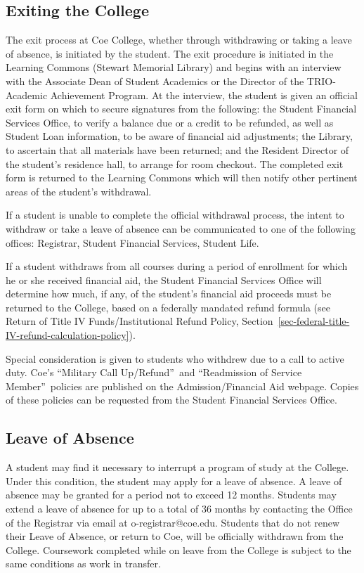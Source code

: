 \documentclass[
  letterpaper,
]{scrbook}
\begin{document}
\subsection{Exiting the College}\label{exiting-the-college}

The exit process at Coe College, whether through withdrawing or taking a
leave of absence, is initiated by the student. The exit procedure is
initiated in the Learning Commons (Stewart Memorial Library) and begins
with an interview with the Associate Dean of Student Academics or the
Director of the TRIO-Academic Achievement Program. At the interview, the
student is given an official exit form on which to secure signatures
from the following: the Student Financial Services Office, to verify a
balance due or a credit to be refunded, as well as Student Loan
information, to be aware of financial aid adjustments; the Library, to
ascertain that all materials have been returned; and the Resident
Director of the student's residence hall, to arrange for room checkout.
The completed exit form is returned to the Learning Commons which will
then notify other pertinent areas of the student's withdrawal.

If a student is unable to complete the official withdrawal process, the
intent to withdraw or take a leave of absence can be communicated to one
of the following offices: Registrar, Student Financial Services, Student
Life.

If a student withdraws from all courses during a period of enrollment
for which he or she received financial aid, the Student Financial
Services Office will determine how much, if any, of the student's
financial aid proceeds must be returned to the College, based on a
federally mandated refund formula (see Return of Title IV
Funds/Institutional Refund Policy,
Section~\ref{sec-federal-title-IV-refund-calculation-policy}).

Special consideration is given to students who withdrew due to a call to
active duty. Coe's ``Military Call Up/Refund''~and ``Readmission of
Service Member''~policies are published on the Admission/Financial Aid
webpage. Copies of these policies can be requested from the Student
Financial Services Office.

\subsection{Leave of Absence}\label{leave-of-absence}

A student may find it necessary to interrupt a program of study at the
College. Under this condition, the student may apply for a leave of
absence. A leave of absence may be granted for a period not to exceed 12
months. Students may extend a leave of absence for up to a total of 36
months by contacting the Office of the Registrar via email at
o-registrar@coe.edu. Students that do not renew their Leave of Absence,
or return to Coe, will be officially withdrawn from the College.
Coursework completed while on leave from the College is subject to the
same conditions as work in transfer.
\end{document}
